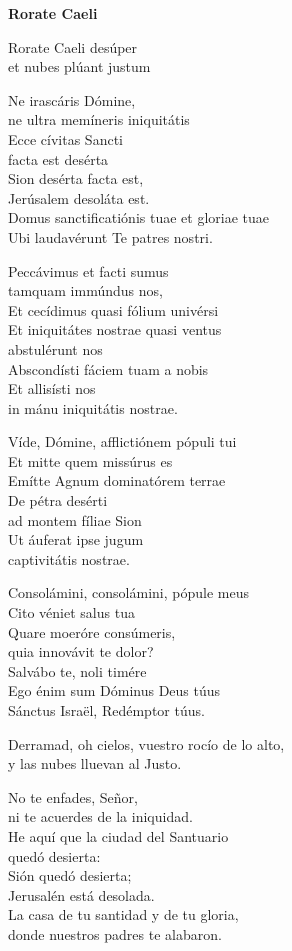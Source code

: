 \documentclass[]{article}
\begin{document}
\textbf{Rorate Caeli}



Rorate Caeli desúper\\ et nubes plúant justum

Ne irascáris Dómine,\\ ne ultra memíneris iniquitátis\\ Ecce cívitas Sancti\\ facta est desérta\\ Sion desérta facta est,\\ Jerúsalem desoláta est.\\ Domus sanctificatiónis tuae et gloriae tuae\\ Ubi laudavérunt Te patres nostri.

Peccávimus et facti sumus\\ tamquam immúndus nos,\\ Et cecídimus quasi fólium univérsi\\ Et iniquitátes nostrae quasi ventus\\ abstulérunt nos\\ Abscondísti fáciem tuam a nobis\\ Et allisísti nos\\ in mánu iniquitátis nostrae.

Víde, Dómine, afflictiónem pópuli tui\\ Et mitte quem missúrus es\\ Emítte Agnum dominatórem terrae\\ De pétra desérti\\ ad montem fíliae Sion\\ Ut áuferat ipse jugum\\ captivitátis nostrae.

Consolámini, consolámini, pópule meus\\ Cito véniet salus tua\\ Quare moeróre consúmeris,\\ quia innovávit te dolor?\\ Salvábo te, noli timére\\ Ego énim sum Dóminus Deus túus\\ Sánctus Israël, Redémptor túus.\strut



Derramad, oh cielos, vuestro rocío de lo alto,\\ y las nubes lluevan al Justo.

No te enfades, Señor,\\ ni te acuerdes de la iniquidad.\\ He aquí que la ciudad del Santuario\\ quedó desierta:\\ Sión quedó desierta;\\ Jerusalén está desolada.\\ La casa de tu santidad y de tu gloria,\\ donde nuestros padres te alabaron.
\end{document}
